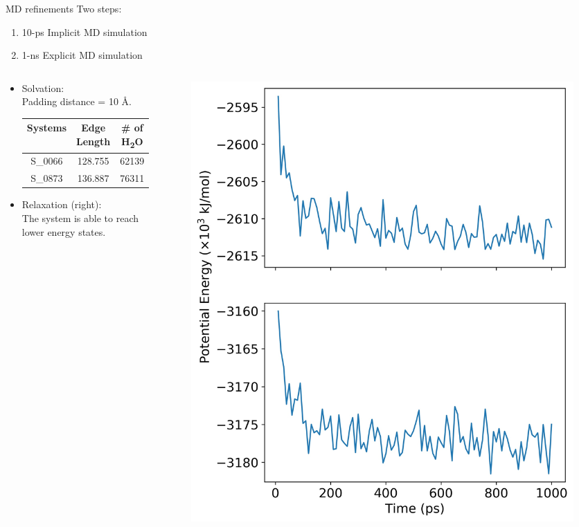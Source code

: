 \documentclass{beamer}
\begin{document}
\begin{frame}{MD refinements} 
Two steps: 
\begin{enumerate}
\item 10-ps Implicit MD simulation 
\item 1-ns Explicit MD simulation 
\end{enumerate} 

\begin{columns}
\begin{column}{0.6\textwidth} 
\begin{itemize} 
\item
Solvation: \\ \hspace{.1in}  Padding distance = 10 \AA. 
\begin{tabular}{c|cc} 
	\hline
	Systems & Edge Length & \# of H\textsubscript{2}O\\ \hline
	S\_0066 & 128.755 & 62139 \\
	S\_0873 & 136.887 & 76311 \\ \hline
\end{tabular} 
\item 
Relaxation (right): \\
The system is able to reach lower energy states. 
\end{itemize}
\end{column} 

\begin{column}{0.4\textwidth}  %
\begin{figure}
\includegraphics[width=\linewidth]{./Figures/Energy.jpg}
\end{figure}
\end{column} 
\end{columns}
\end{frame}
\end{document}
